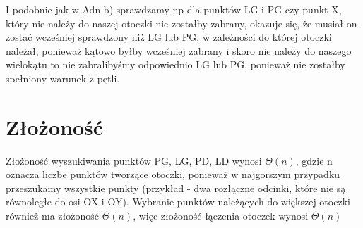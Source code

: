 \documentclass{article}
\begin{document}
I podobnie jak w Adn b) sprawdzamy np dla punktów LG i PG czy punkt X, który nie należy do naszej otoczki nie zostałby zabrany, okazuje się, że musiał on zostać wcześniej sprawdzony niż LG lub PG, w zależności do której otoczki należał, ponieważ kątowo byłby wcześniej zabrany i skoro nie należy do naszego wielokątu to nie zabralibyśmy odpowiednio LG lub PG, ponieważ nie zostałby spełniony warunek z pętli.

\section{Złożoność}
Złożoność wyszukiwania punktów PG, LG, PD, LD wynosi $\Theta(n)$, gdzie n oznacza liczbe punktów tworzące otoczki, ponieważ w najgorszym przypadku przeszukamy wszystkie punkty (przykład - dwa rozłączne odcinki, które nie są równoległe do osi OX i OY). Wybranie punktów należących do większej otoczki również ma złożoność $\Theta(n)$, więc złożoność łączenia otoczek wynosi $\Theta(n)$
\end{document}
